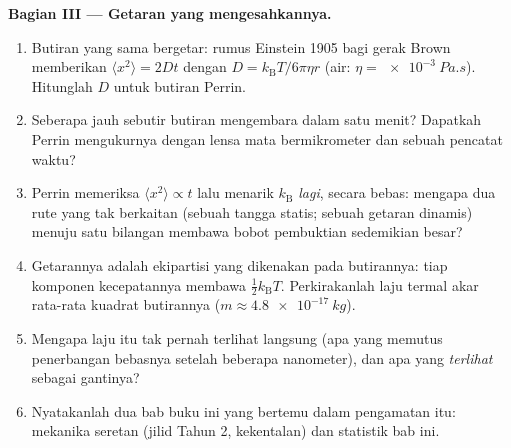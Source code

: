 \begin{problem}
\medskip\noindent\textbf{Bagian III --- Getaran yang mengesahkannya.}
\begin{enumerate}[resume]
  \item Butiran yang sama bergetar: rumus Einstein 1905 bagi gerak
        Brown memberikan $\langle x^2\rangle = 2Dt$ dengan $D =
        k_{\text{B}}T/6\pi\eta r$ (air: $\eta =
        \qty{e-3}{Pa.s}$). Hitunglah $D$ untuk butiran Perrin.
  \item Seberapa jauh sebutir butiran mengembara dalam satu menit?
        Dapatkah Perrin mengukurnya dengan lensa mata bermikrometer dan
        sebuah pencatat waktu?
  \item Perrin memeriksa $\langle x^2\rangle \propto t$ lalu menarik
        $k_{\text{B}}$ \emph{lagi}, secara bebas: mengapa dua rute yang
        tak berkaitan (sebuah tangga statis; sebuah getaran dinamis)
        menuju satu bilangan membawa bobot pembuktian sedemikian besar?
  \item Getarannya adalah ekipartisi yang dikenakan pada butirannya:
        tiap komponen kecepatannya membawa $\tfrac12 k_{\text{B}}T$.
        Perkirakanlah laju termal akar rata-rata kuadrat butirannya ($m \approx
        \qty{4.8e-17}{kg}$).
  \item Mengapa laju itu tak pernah terlihat langsung (apa yang
        memutus penerbangan bebasnya setelah beberapa nanometer), dan
        apa yang \emph{terlihat} sebagai gantinya?
  \item Nyatakanlah dua bab buku ini yang bertemu dalam pengamatan itu:
        mekanika seretan (jilid Tahun 2, kekentalan) dan statistik bab
        ini.
\end{enumerate}


\end{problem}
